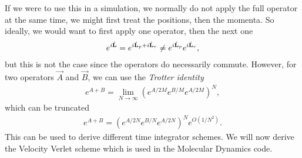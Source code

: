 If we were to use this in a simulation, we normally do not apply the full operator at the same time, we might first treat the positions, then the momenta. So ideally, we would want to first apply one operator, then the next one
\begin{align}
	e^{i\hat{\mathbf L}} = e^{i\hat{\mathbf L}_p + i\hat{\mathbf L}_r} \neq e^{i\hat{\mathbf L}_p}e^{i\hat{\mathbf L}_r},
\end{align}
but this is not the case since the operators do necessarily commute. However, for two operators $\vec A$ and $\vec B$, we can use the \textit{Trotter identity}\cite{frenkel2001understanding}
\begin{align}
	e^{A + B} = \lim_{N\rightarrow\infty}\left(e^{A/2M}e^{B/M}e^{A/2M}\right)^N,
\end{align}
which can be truncated
\begin{align}
	e^{A + B} = \left(e^{A/2N}e^{B/N}e^{A/2N}\right)^Ne^{O(1/N^2)}.
\end{align}
This can be used to derive different time integrator schemes. We will now derive the Velocity Verlet scheme which is used in the Molecular Dynamics code.

